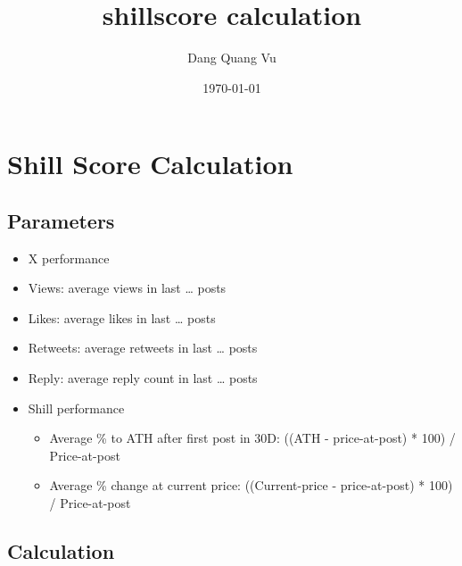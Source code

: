 \documentclass[11pt]{article}
\author{Dang Quang Vu}
\date{\today}
\title{shillscore calculation}
\begin{document}
\maketitle
\tableofcontents


\section{Shill Score Calculation}
\label{sec:orgc1c9252}
\subsection{Parameters}
\label{sec:org5e3c299}
\begin{itemize}
\item X performance
\item Views: average views in last … posts
\item Likes: average likes in last … posts
\item Retweets: average retweets in last … posts
\item Reply: average reply count in last … posts
\item Shill performance
\begin{itemize}
\item Average \% to ATH after first post in 30D: ((ATH - price-at-post) * 100) / Price-at-post
\item Average \% change at current price: ((Current-price - price-at-post) * 100) / Price-at-post
\end{itemize}
\end{itemize}

\subsection{Calculation}
\label{sec:org25cc54c}
\end{document}
